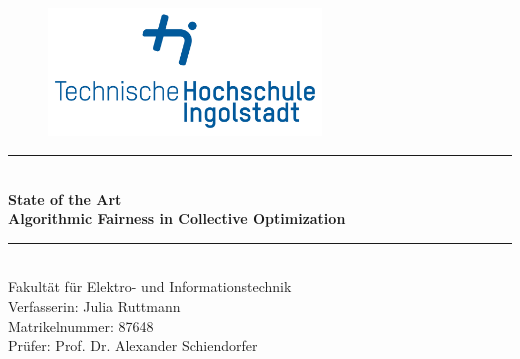 \documentclass[german, a4paper, 11pt, oneside]{scrbook}
\begin{document}
\thispagestyle{empty}
\begin{figure}[t]
 \centering
 \includegraphics[height=3.4cm, trim=1.2cm 1.2cm 1.2cm 1.2cm]{thi_logo}
\end{figure}
\begin{center}
\vspace*{2cm}

\vspace*{2cm}
\par\noindent\rule{\textwidth}{0.2pt}
\\
\vspace*{0.5cm}
{\huge \textbf{State of the Art}}\\
{\LARGE \textbf{Algorithmic Fairness in Collective Optimization}}
\par\noindent\rule{\textwidth}{0.2pt}
\\
\vspace*{2cm}
{\huge Fakultät für Elektro- und Informationstechnik}
\\
\vspace*{2cm}
{\LARGE Verfasserin: Julia Ruttmann \\Matrikelnummer: 87648\\Prüfer: Prof. Dr. Alexander Schiendorfer\\}

\end{center}
\newpage
\tableofcontents
\thispagestyle{empty}
\newpage
\setcounter{page}{1}
\end{document}
